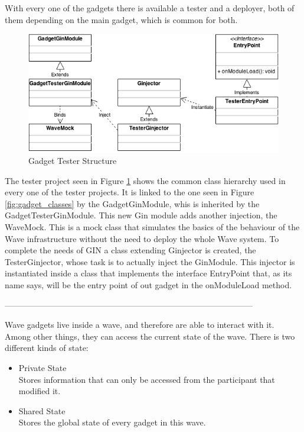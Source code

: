 With every one of the gadgets there is available a tester and a deployer, both of them depending on the main gadget, which is common for both.\\[.2cm]
\begin{figure}[h]
  \center
    \includegraphics[keepaspectratio, scale=0.5]{Media/Diagrams/Gadget/Tester.png}
  \caption{Gadget Tester Structure}
  \label{fig:gadget_tester}
\end{figure}
The tester project seen in Figure \ref{fig:gadget_tester} shows the common class hierarchy used in every
 one of the tester projects. It is linked to the one seen in Figure \ref{fig:gadget_classes} by the GadgetGinModule, whis is inherited by the GadgetTesterGinModule. This new Gin module adds another injection, the WaveMock. This is a mock class that simulates the basics of the behaviour of the Wave infrastructure without the need to deploy the whole Wave system. To complete the needs of GIN a class extending Ginjector is created, the TesterGinjector, whose task is to actually inject the GinModule. This injector is instantiated inside a class that implements the interface EntryPoint that, as its name says, will be the entry point of out gadget in the onModuleLoad method.


\begin{center}
------------------------------------------------------------------------------------------\\
\end{center}

Wave gadgets live inside a wave, and therefore are able to interact with it. Among other things, they can access the current state of the wave. There is two different kinds of state:

\begin{itemize}
  \item Private State\\
        Stores information that can only be accessed from the participant that modified it.
  \item Shared State\\
        Stores the global state of every gadget in this wave.
\end{itemize}

